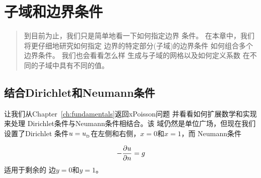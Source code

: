 \chapter{子域和边界条件}
\label{ch:subdomains}



\begin{quote}
到目前为止，我们只是简单地看一下如何指定边界
条件。 在本章中，我们将更仔细地研究如何指定
边界的特定部分(子域)的边界条件
如何组合多个边界条件。 我们也会看看怎么样
生成与子域的网格以及如何定义系数
在不同的子域中具有不同的值。
\end{quote}


\section{结合Dirichlet和Neumann条件}
\label{ch:poisson0:DN}

让我们从Chapter~\ref{ch:fundamentals}返回xPoisson问题
并看看如何扩展数学和实现来处理
Dirichlet条件与Neumann条件相结合。该
域仍然是单位广场，但现在我们设置了Dirichlet
条件$u=\ub$在左侧和右侧，$x=0$和$x=1$，而
Neumann条件

\begin{equation*}
-{\partial u\over\partial n}=g
\end{equation*}
适用于剩余的
边$y=0$和$y=1$。


